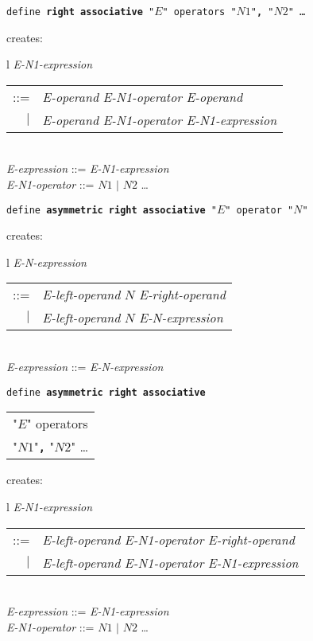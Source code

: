 \documentclass[12pt]{article}
\newcommand{\TT}[1]{{\tt \bfseries #1}}
\newenvironment{indpar}[1][0.3in]%
	{\begin{list}{}%
		     {\setlength{\itemsep}{0in}%
		      \setlength{\topsep}{0in}%
		      \setlength{\parsep}{1ex}%
		      \setlength{\labelwidth}{#1}%
		      \setlength{\leftmargin}{#1}%
		      \addtolength{\leftmargin}{\labelsep}}%
	 \item}%
	{\end{list}}
\begin{document}
\begin{indpar}
{\tt define \TT{right associative} "$E$" operators "$N1$"\TT{,} "$N2$" \ldots}
\begin{indpar}
creates: \begin{tabular}[t]{l}
         {\em E-N1-expression} \begin{tabular}[t]{rl}
                            ::= & {\em E-operand} {\em E-N1-operator}
			          {\em E-operand} \\
                            $|$ & {\em E-operand} {\em E-N1-operator}
			          {\em E-N1-expression} \\
                            \end{tabular} \\
         {\em E-expression} ::= {\em E-N1-expression} \\
         {\em E-N1-operator} ::= $N1$ $|$ $N2$ \ldots \\
	 \end{tabular}
\end{indpar}

{\tt define \TT{asymmetric right associative} "$E$" operator "$N$"}
\begin{indpar}
creates: \begin{tabular}[t]{l}
         {\em E-N-expression} \begin{tabular}[t]{rl}
                            ::= & {\em E-left-operand} $N$
			          {\em E-right-operand} \\
                            $|$ & {\em E-left-operand} $N$
			          {\em E-N-expression} \\
                            \end{tabular} \\
         {\em E-expression} ::= {\em E-N-expression} \\
	 \end{tabular}
\end{indpar}

{\tt define \TT{asymmetric right associative} \begin{tabular}[t]{l}
                                             "$E$" operators \\
					     "$N1$"\TT{,} "$N2$" \ldots \\
					     \end{tabular}}
\begin{indpar}
creates: \begin{tabular}[t]{l}
         {\em E-N1-expression} \begin{tabular}[t]{rl}
                            ::= & {\em E-left-operand} {\em E-N1-operator}
			          {\em E-right-operand} \\
                            $|$ & {\em E-left-operand} {\em E-N1-operator}
			          {\em E-N1-expression} \\
                            \end{tabular} \\
         {\em E-expression} ::= {\em E-N1-expression} \\
         {\em E-N1-operator} ::= $N1$ $|$ $N2$ \ldots \\
	 \end{tabular}
\end{indpar}


\end{indpar}
\end{document}
